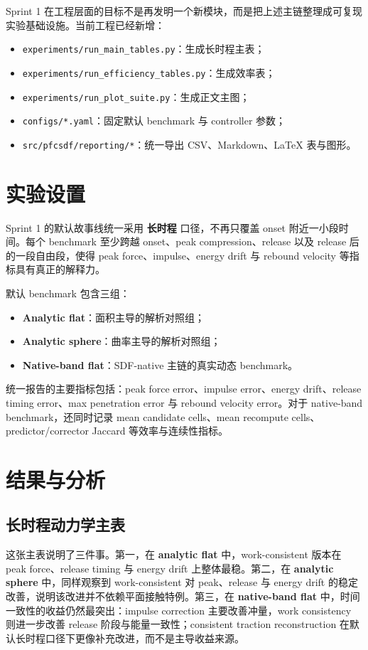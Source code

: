 \documentclass[11pt,a4paper]{ctexart}
\begin{document}
Sprint 1 在工程层面的目标不是再发明一个新模块，而是把上述主链整理成可复现实验基础设施。当前工程已经新增：
\begin{itemize}
    \item \texttt{experiments/run\_main\_tables.py}：生成长时程主表；
    \item \texttt{experiments/run\_efficiency\_tables.py}：生成效率表；
    \item \texttt{experiments/run\_plot\_suite.py}：生成正文主图；
    \item \texttt{configs/*.yaml}：固定默认 benchmark 与 controller 参数；
    \item \texttt{src/pfcsdf/reporting/*}：统一导出 CSV、Markdown、LaTeX 表与图形。
\end{itemize}

\section{实验设置}
Sprint 1 的默认故事线统一采用 \textbf{长时程} 口径，不再只覆盖 onset 附近一小段时间。每个 benchmark 至少跨越 onset、peak compression、release 以及 release 后的一段自由段，使得 peak force、impulse、energy drift 与 rebound velocity 等指标具有真正的解释力。

默认 benchmark 包含三组：
\begin{itemize}
    \item \textbf{Analytic flat}：面积主导的解析对照组；
    \item \textbf{Analytic sphere}：曲率主导的解析对照组；
    \item \textbf{Native-band flat}：SDF-native 主链的真实动态 benchmark。
\end{itemize}

统一报告的主要指标包括：peak force error、impulse error、energy drift、release timing error、max penetration error 与 rebound velocity error。对于 native-band benchmark，还同时记录 mean candidate cells、mean recompute cells、predictor/corrector Jaccard 等效率与连续性指标。

\section{结果与分析}
\subsection{长时程动力学主表}


这张主表说明了三件事。第一，在 \textbf{analytic flat} 中，work-consistent 版本在 peak force、release timing 与 energy drift 上整体最稳。第二，在 \textbf{analytic sphere} 中，同样观察到 work-consistent 对 peak、release 与 energy drift 的稳定改善，说明该改进并不依赖平面接触特例。第三，在 \textbf{native-band flat} 中，时间一致性的收益仍然最突出：impulse correction 主要改善冲量，work consistency 则进一步改善 release 阶段与能量一致性；consistent traction reconstruction 在默认长时程口径下更像补充改进，而不是主导收益来源。
\end{document}

